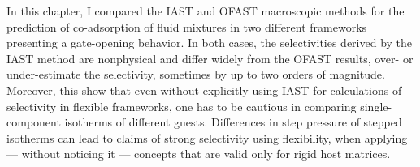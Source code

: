 \documentclass[thesis]{subfiles}
\begin{document}

In this chapter, I compared the IAST and OFAST macroscopic methods for the
prediction of co-adsorption of fluid mixtures in two different frameworks
presenting a gate-opening behavior. In both cases, the selectivities derived by
the IAST method are nonphysical and differ widely from the OFAST results, over-
or under-estimate the selectivity, sometimes by up to two orders of magnitude.
Moreover, this show that even without explicitly using IAST for calculations of
selectivity in flexible frameworks, one has to be cautious in comparing
single-component isotherms of different guests. Differences in step pressure of
stepped isotherms can lead to claims of strong selectivity using flexibility,
when applying --- without noticing it --- concepts that are valid only for rigid
host matrices.
\end{document}
